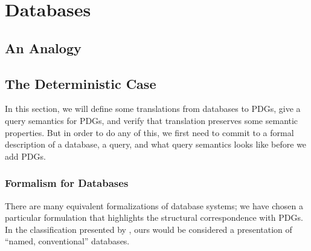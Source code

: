 \documentclass[the-pdg-manual.tex]{subfiles}
\begin{document}
	\section{Databases}
    \subsection{An Analogy}
	
	
	\subsection{The Deterministic Case}
	
	In this section, we will define some translations from databases to PDGs,
	give a query semantics for PDGs, and verify that translation preserves some semantic properties. 
	But in order to do any of this, we first need to commit to a formal description of a database, a query, and what query semantics looks like before we add PDGs. 
	\subsubsection{Formalism for Databases}
	There are many equivalent formalizations of database systems; we have chosen a 
	particular formulation that highlights the structural correspondence with PDGs.
	In the classification presented by \cite[\S3.3]{abiteboul1995foundations}, ours 
	would be considered a presentation of ``named, conventional'' databases.
	
\end{document}
